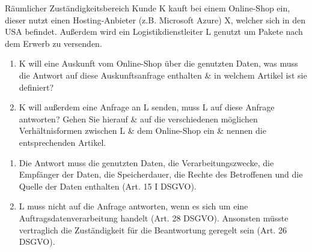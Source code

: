 \documentclass{article}
\begin{document}
\begin{exercise}{Räumlicher Zuständigkeitsbereich}
  Kunde K kauft bei einem Online-Shop ein, dieser nutzt einen Hosting-Anbieter (z.B. Microsoft Azure) X, welcher sich in den USA befindet. Außerdem wird ein Logistikdienstleiter L genutzt um Pakete nach dem Erwerb zu versenden.
  \begin{enumerate}
    \item K will eine Auskunft vom Online-Shop über die genutzten Daten, was muss die Antwort auf diese Auskunftsanfrage enthalten \& in welchem Artikel ist sie definiert?
    \item K will außerdem eine Anfrage an L senden, muss L auf diese Anfrage antworten? Gehen Sie hierauf \& auf die verschiedenen möglichen Verhältnisformen zwischen L \& dem Online-Shop ein \& nennen die entsprechenden Artikel.
  \end{enumerate}

  \begin{solution}
    \begin{enumerate}
      \item Die Antwort muss die genutzten Daten, die Verarbeitungszwecke, die Empfänger der Daten, die Speicherdauer, die Rechte des Betroffenen und die Quelle der Daten enthalten (Art. 15 I DSGVO).
      \item L muss nicht auf die Anfrage antworten, wenn es sich um eine Auftragsdatenverarbeitung handelt (Art. 28 DSGVO). Ansonsten müsste vertraglich die Zuständigkeit für die Beantwortung geregelt sein (Art. 26 DSGVO).
    \end{enumerate}
  \end{solution}
\end{exercise}
\end{document}
